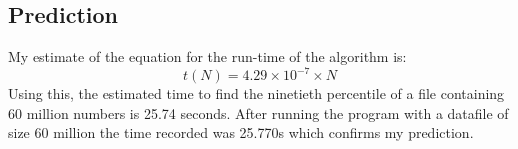 \documentclass{article}
\begin{document}
\subsection{Prediction}
\label{sec:prediction2}

My estimate of the equation for the run-time of the algorithm is:
\begin{equation}
  \label{eq:estimated_runtime2}
  t(N) = 4.29\times10^{-7}\times N
\end{equation}
Using this, the estimated time to find the ninetieth percentile of a
file containing 60 million numbers is 25.74 seconds. After running the program 
with a datafile of size 60 million the time recorded was 25.770s which confirms
my prediction.
\end{document}
